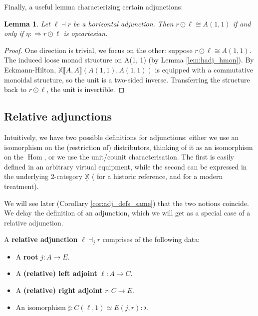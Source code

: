 \documentclass[10pt,a4paper]{article}
\newcommand{\bb}[1]{\mathbb{#1}}
\newcommand{\To}{\Rightarrow}
\newcommand{\iset}[1]{\llbracket #1 \rrbracket}
\newcommand{\simeqq}{\cong}
\DeclareMathOperator{\Hom}{Hom}
\theoremstyle{plain}
\newtheorem{lemma}[theorem]{Lemma}
\theoremstyle{definition}
\theoremstyle{remark}
\begin{document}
Finally, a useful lemma characterizing certain adjunctions:

\begin{lemma}
    \label{lem:hadj_opcart}
    Let $\ell \dashv r$ be a horizontal adjunction. Then $r\odot\ell\simeqq A(1, 1)$ if and only if $\eta:\To r\odot\ell$ is opcartesian.
\end{lemma}

\begin{proof}
    One direction is trivial, we focus on the other: suppose $r\odot\ell\simeqq A(1, 1)$. The induced loose monad structure on A(1, 1) (by Lemma \ref{lem:hadj_hmon}). By Eckmann-Hilton, $\bb{X}\iset{A, A}(A(1, 1), A(1, 1))$ is equipped with a commutative monoidal structure, so the unit is a two-sided inverse. Transferring the structure back to $r\odot\ell$, the unit is invertible.
\end{proof}

\subsection{Relative adjunctions}

Intuitively, we have two possible definitions for adjunctions: either we use an isomorphism on the (restriction of) distributors, thinking of it as an isomorphism on the $\Hom$, or we use the unit/counit characterisation. The first is easily defined in an arbitrary virtual equipment, while the second can be expressed in the underlying 2-category $\underline{\bb{X}}$ (\cite[p.~762]{maranda} for a historic reference, \cite[Paragraph~1.1]{auderset_2-cat_adj} and \cite[Section 1.11]{kelly} for a modern treatment).

We will see later (Corollary \ref{cor:adj_defs_same}) that the two notions coincide. We delay the definition of an adjunction, which we will get as a special case of a relative adjunction.

\begin{definition}
    \begin{figure}
        \centering
    \end{figure}
    A \textbf{relative adjunction} $\ell \dashv_j r$ comprises of the following data:
    \begin{itemize}
        \item A \textbf{root} $j : A \to E$.
        \item A \textbf{(relative) left adjoint} $\ell : A \to C$.
        \item A \textbf{(relative) right adjoint} $r : C \to E$.
        \item An isomorphism $\sharp : C(\ell, 1) \simeq E(j, r) : \flat$.
    \end{itemize}
\end{definition}
\end{document}
